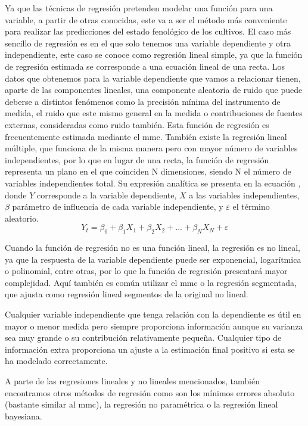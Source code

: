 \par Ya que las técnicas de regresión pretenden modelar una función para una variable, a partir de otras conocidas, este va a ser el método más conveniente para realizar las predicciones del estado fenológico de los cultivos. El caso más sencillo de regresión es en el que solo tenemos una variable dependiente y otra independiente, este caso se conoce como regresión lineal simple, ya que la función de regresión estimada se corresponde a una ecuación lineal de una recta. Los datos que obtenemos para la variable dependiente que vamos a relacionar tienen, aparte de las componentes lineales, una componente aleatoria de ruido que puede deberse a distintos fenómenos como la precisión mínima del instrumento de medida, el ruido que este mismo general en la medida o contribuciones de fuentes externas, consideradas como ruido también. Esta función de regresión es frecuentemente estimada mediante el \gls{mmc}. También existe la regresión lineal múltiple, que funciona de la misma manera pero con mayor número de variables independientes, por lo que en lugar de una recta, la función de regresión representa un plano en el que coinciden N dimensiones, siendo N el número de variables independientes total. Su expresión analítica se presenta en la ecuación \label{RL}, donde $Y$ corresponde a la variable dependiente, $X$ a las variables independientes, $\beta$ parámetro de influencia de cada variable independiente, y $\varepsilon$ el término aleatorio.
\\
\begin{equation} \label{RL}
Y_{t}=\beta _{0}+\beta _{1} X_{1}+\beta _{2} X_{2}+...+\beta _{N} X_{N}+\varepsilon 
\end{equation}
\par Cuando la función de regresión no es una función lineal, la regresión es no lineal, ya que la respuesta de la variable dependiente puede ser exponencial, logarítmica o polinomial, entre otras, por lo que la función de regresión presentará mayor complejidad. Aquí también es común utilizar el \gls{mmc} o la regresión segmentada, que ajusta como regresión lineal segmentos de la original no lineal.
\\
\par Cualquier variable independiente que tenga relación con la dependiente es útil en mayor o menor medida pero siempre proporciona información aunque su varianza sea muy grande o su contribución relativamente pequeña. Cualquier tipo de información extra proporciona un ajuste a la estimación final positivo si esta se ha modelado correctamente. 
\\
\par A parte de las regresiones lineales y no lineales mencionados, también encontramos otros métodos de regresión como son los mínimos errores absoluto (bastante similar al \gls{mmc}), la regresión no paramétrica o la regresión lineal bayesiana.

